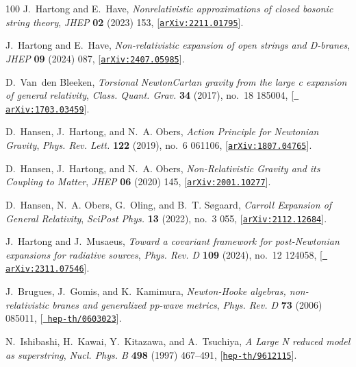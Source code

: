 \documentclass[11pt]{article}
\begin{document}
\begin{thebibliography}{100}
J.~Hartong and E.~Have, {\it {Nonrelativistic approximations of closed bosonic
  string theory}},  {\em JHEP} {\bf 02} (2023) 153,
  [\href{http://arxiv.org/abs/2211.01795}{{\tt arXiv:2211.01795}}].

J.~Hartong and E.~Have, {\it {Non-relativistic expansion of open strings and
  D-branes}},  {\em JHEP} {\bf 09} (2024) 087,
  [\href{http://arxiv.org/abs/2407.05985}{{\tt arXiv:2407.05985}}].

D.~Van~den Bleeken, {\it {Torsional Newton\textendash{}Cartan gravity from the
  large c expansion of general relativity}},  {\em Class. Quant. Grav.} {\bf
  34} (2017), no.~18 185004, [\href{http://arxiv.org/abs/1703.03459}{{\tt
  arXiv:1703.03459}}].

D.~Hansen, J.~Hartong, and N.~A. Obers, {\it {Action Principle for Newtonian
  Gravity}},  {\em Phys. Rev. Lett.} {\bf 122} (2019), no.~6 061106,
  [\href{http://arxiv.org/abs/1807.04765}{{\tt arXiv:1807.04765}}].

D.~Hansen, J.~Hartong, and N.~A. Obers, {\it {Non-Relativistic Gravity and its
  Coupling to Matter}},  {\em JHEP} {\bf 06} (2020) 145,
  [\href{http://arxiv.org/abs/2001.10277}{{\tt arXiv:2001.10277}}].

D.~Hansen, N.~A. Obers, G.~Oling, and B.~T. S\o{}gaard, {\it {Carroll Expansion
  of General Relativity}},  {\em SciPost Phys.} {\bf 13} (2022), no.~3 055,
  [\href{http://arxiv.org/abs/2112.12684}{{\tt arXiv:2112.12684}}].

J.~Hartong and J.~Musaeus, {\it {Toward a covariant framework for
  post-Newtonian expansions for radiative sources}},  {\em Phys. Rev. D} {\bf
  109} (2024), no.~12 124058, [\href{http://arxiv.org/abs/2311.07546}{{\tt
  arXiv:2311.07546}}].

J.~Brugues, J.~Gomis, and K.~Kamimura, {\it {Newton-Hooke algebras,
  non-relativistic branes and generalized pp-wave metrics}},  {\em Phys. Rev.
  D} {\bf 73} (2006) 085011, [\href{http://arxiv.org/abs/hep-th/0603023}{{\tt
  hep-th/0603023}}].

N.~Ishibashi, H.~Kawai, Y.~Kitazawa, and A.~Tsuchiya, {\it {A Large N reduced
  model as superstring}},  {\em Nucl. Phys. B} {\bf 498} (1997) 467--491,
  [\href{http://arxiv.org/abs/hep-th/9612115}{{\tt hep-th/9612115}}].


\end{thebibliography}
\end{document}
